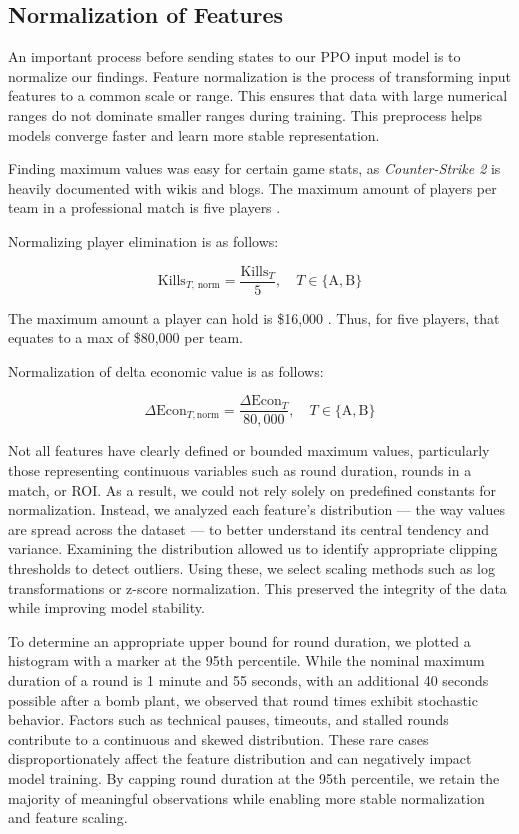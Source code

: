 \documentclass[sigconf]{acmart}
\begin{document}
\subsection{Normalization of Features}

An important process before sending states to our PPO input model is to normalize our findings. Feature normalization is the process of transforming input features to a common scale or range. This ensures that data with large numerical ranges do not dominate smaller ranges during training. This preprocess helps models converge faster and learn more stable representation.

Finding maximum values was easy for certain game stats, as \textit{Counter-Strike 2} is heavily documented with wikis and blogs. The maximum amount of players per team in a professional match is five players \cite{cs2competitivewiki}. 

Normalizing player elimination is as follows:

\begin{equation}
  \text{Kills}_{T,\,\text{norm}} = \frac{\text{Kills}_T}{5}, \quad T \in \{\text{A}, \text{B}\}
\end{equation}

The maximum amount a player can hold is \$16{,}000 \cite{cs2moneywiki}. Thus, for five players, that equates to a max of \$80{,}000 per team. 

Normalization of delta economic value is as follows:

\begin{equation}
  \Delta\text{Econ}_{T,\text{norm}} = \frac{\Delta\text{Econ}_{T}}{80{,}000}, \quad T \in \{\text{A}, \text{B}\}
\end{equation}

Not all features have clearly defined or bounded maximum values, particularly those representing continuous variables such as round duration, rounds in a match, or ROI. As a result, we could not rely solely on predefined constants for normalization. Instead, we analyzed each feature’s distribution — the way values are spread across the dataset — to better understand its central tendency and variance. Examining the distribution allowed us to identify appropriate clipping thresholds to detect outliers. Using these, we select scaling methods such as log transformations or z-score normalization. This preserved the integrity of the data while improving model stability.

To determine an appropriate upper bound for round duration, we plotted a histogram with a marker at the 95th percentile. While the nominal maximum duration of a round is 1 minute and 55 seconds, with an additional 40 seconds possible after a bomb plant, we observed that round times exhibit stochastic behavior. Factors such as technical pauses, timeouts, and stalled rounds contribute to a continuous and skewed distribution. These rare cases disproportionately affect the feature distribution and can negatively impact model training. By capping round duration at the 95th percentile, we retain the majority of meaningful observations while enabling more stable normalization and feature scaling.
\end{document}
